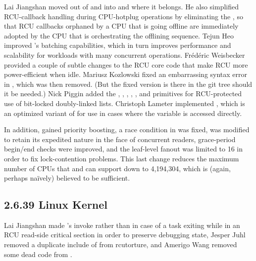 Lai Jiangshan moved  out of
 and into  and
 where it belongs.
He also simplified RCU-callback handling during CPU-hotplug operations
by eliminating the , so that RCU callbacks
orphaned by a CPU that is going offline are immediately adopted by
the CPU that is orchestrating the offlining sequence.
Tejun Heo improved 's batching
capabilities, which in turn improves performance and scalability
for workloads with many concurrent 
operations.
Fr\'ed\'eric Weisbecker provided a couple of subtle changes to the
RCU core code that make RCU more power-efficient when idle.
Mariusz Kozlowski fixed an embarrassing syntax error in
, which was then removed.
(But the fixed version is there in the git tree should it be needed.)
Nick Piggin added the ,
,
,
,
, and
 primitives for RCU-protected use
of bit-locked doubly-linked lists.
Christoph Lameter implemented , which is an
optimized variant of
 for use in cases where the variable is accessed directly.

In addition,  gained priority boosting, a race condition
in  was fixed,
 was modified to retain its expedited
nature in the face of concurrent readers,
grace-period begin/end checks were improved,
and the  leaf-level fanout was limited to 16 in order to fix
lock-contention problems.
This last change reduces the maximum number of CPUs that 
and  can support down to 4,194,304, which is
(again, perhaps na\"ively) believed to be sufficient.

\subsection{2.6.39 Linux Kernel}

Lai Jiangshan made 's  invoke
rather than  in case of a task exiting while
in an RCU read-side critical section in order to preserve debugging
state,
Jesper Juhl removed a duplicate include of  from
rcutorture,
and
Amerigo Wang removed some dead code from .

